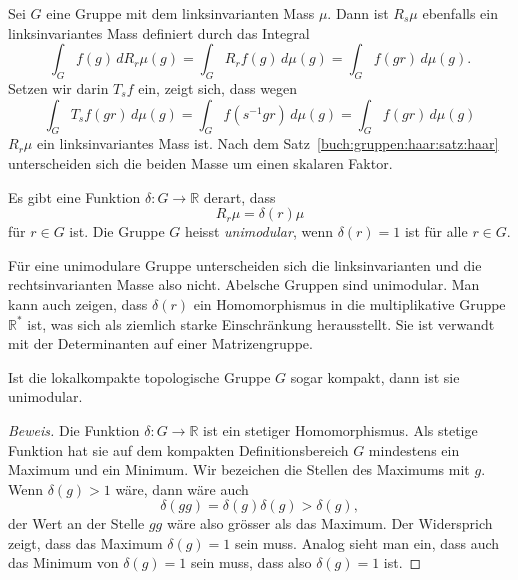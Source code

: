 Sei $G$ eine Gruppe mit dem linksinvarianten Mass $\mu$.
Dann ist $R_s\mu$ ebenfalls ein linksinvariantes Mass definiert
durch das Integral
\[
\int_G f(g) \, dR_r\mu(g)
=
\int_G R_rf(g) \,d\mu(g)
=
\int_G f(gr)\,d\mu(g).
\]
Setzen wir darin $T_sf$ ein, zeigt sich, dass wegen
\[
\int_G T_sf(gr)\,d\mu(g)
=
\int_G f(s^{-1}gr)\,d\mu(g)
=
\int_G f(gr)\,d\mu(g)
\]
$R_r\mu$ ein linksinvariantes Mass ist.
Nach dem Satz~\ref{buch:gruppen:haar:satz:haar} unterscheiden sich
die beiden Masse um einen skalaren Faktor.

\begin{definition}[unimodular]
Es gibt eine Funktion $\delta\colon G\to \mathbb{R}$ derart, dass
\[
R_r \mu = \delta(r) \mu
\]
für $r\in G$
ist.
Die Gruppe $G$ heisst {\em unimodular}, wenn $\delta(r)=1$ ist für
alle $r\in G$.
\end{definition}

Für eine unimodulare Gruppe unterscheiden sich die linksinvarianten
und die rechtsinvarianten Masse also nicht.
Abelsche Gruppen sind unimodular.
Man kann auch zeigen, dass $\delta(r)$ ein Homomorphismus in die
multiplikative Gruppe $\mathbb{R}^*$ ist,
was sich als ziemlich starke Einschränkung herausstellt.
Sie ist verwandt mit der Determinanten auf einer Matrizengruppe.

\begin{satz}
Ist die lokalkompakte topologische Gruppe $G$ sogar kompakt, dann ist
sie unimodular.
\end{satz}

\begin{proof}[Beweis]
Die Funktion $\delta\colon G\to\mathbb{R}$ ist ein stetiger Homomorphismus.
Als stetige Funktion hat sie auf dem kompakten Definitionsbereich $G$
mindestens ein Maximum und ein Minimum.
Wir bezeichen die Stellen des Maximums mit $g$.
Wenn $\delta(g)>1$ wäre, dann wäre auch
\[
\delta(gg)
=
\delta(g)
\delta(g)
>
\delta(g),
\]
der Wert an  der Stelle $gg$ wäre also grösser als das Maximum.
Der Widersprich zeigt, dass das Maximum $\delta(g)=1$ sein muss.
Analog sieht man ein, dass auch das Minimum von $\delta(g)=1$
sein muss, dass also $\delta(g)=1$ ist.
\end{proof}

